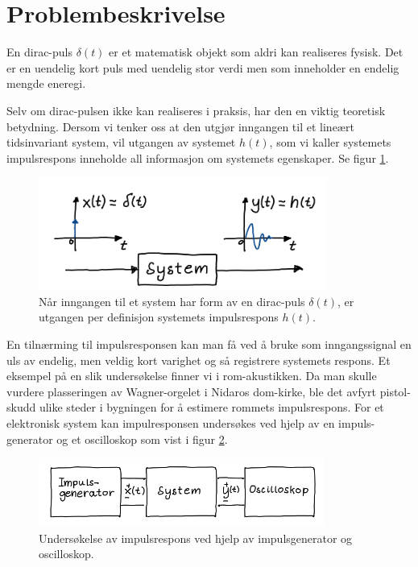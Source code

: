 \section{Problembeskrivelse}
\label{sec:issue}

En dirac-puls $\delta(t)$ er et matematisk objekt som aldri kan realiseres fysisk. Det er en uendelig kort puls med uendelig stor verdi men som inneholder en endelig mengde eneregi.

Selv om dirac-pulsen ikke kan realiseres i praksis, har den en viktig teoretisk betydning. Dersom vi tenker oss at den utgjør inngangen til et lineært tidsinvariant system, vil utgangen av systemet $h(t)$, som vi kaller systemets impulsrespons inneholde all informasjon om systemets egenskaper. Se figur \ref{fig:01_problemstilling}.

\begin{figure}[!hbt]
	\centering
	\includegraphics[]{./Images/01Issue/01.png}
	\caption{Når inngangen til et system har form av en dirac-puls $\delta(t)$, er utgangen per definisjon systemets impulsrespons $h(t)$.}
    \label{fig:01_problemstilling}
\end{figure}


En tilnærming til impulsresponsen kan man få ved å bruke som inngangssignal en uls av endelig, men veldig kort varighet og så registrere systemets respons. Et eksempel på en slik undersøkelse finner vi i rom-akustikken. Da man skulle vurdere plasseringen av Wagner-orgelet i Nidaros dom-kirke, ble det avfyrt pistol-skudd ulike steder i bygningen for å estimere rommets impulsrespons. For et elektronisk system kan impulresponsen undersøkes ved hjelp av en impuls-generator og et oscilloskop som vist i figur \ref{fig:02_problemstilling}.

\begin{figure}[!hbt]
	\centering
	\includegraphics[scale=0.9]{./Images/01Issue/02.png}
	\caption{Undersøkelse av impulsrespons ved hjelp av impulsgenerator og oscilloskop.}
    \label{fig:02_problemstilling}
\end{figure}

